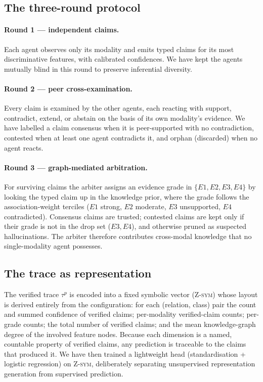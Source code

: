 \documentclass[runningheads]{llncs}
\begin{document}
\subsection{The three-round protocol}
\paragraph{Round 1 --- independent claims.}
Each agent observes only its modality and emits typed claims for its most discriminative features, with calibrated confidences. We have kept the agents mutually blind in this round to preserve inferential diversity.

\paragraph{Round 2 --- peer cross-examination.}
Every claim is examined by the other agents, each reacting with support, contradict, extend, or abstain on the basis of its own modality's evidence. We have labelled a claim consensus when it is peer-supported with no contradiction, contested when at least one agent contradicts it, and orphan (discarded) when no agent reacts.

\paragraph{Round 3 --- graph-mediated arbitration.}
For surviving claims the arbiter assigns an evidence grade in $\{E1,E2,E3,E4\}$ by looking the typed claim up in the knowledge prior, where the grade follows the association-weight terciles ($E1$ strong, $E2$ moderate, $E3$ unsupported, $E4$ contradicted). Consensus claims are trusted; contested claims are kept only if their grade is not in the drop set ($E3,E4$), and otherwise pruned as suspected hallucinations. The arbiter therefore contributes cross-modal knowledge that no single-modality agent possesses.

\subsection{The trace as representation}
The verified trace $\tau^p$ is encoded into a fixed symbolic vector (\textsc{Z-sym}) whose layout is derived entirely from the configuration: for each (relation, class) pair the count and summed confidence of verified claims; per-modality verified-claim counts; per-grade counts; the total number of verified claims; and the mean knowledge-graph degree of the involved feature nodes. Because each dimension is a named, countable property of verified claims, any prediction is traceable to the claims that produced it. We have then trained a lightweight head (standardisation + logistic regression) on \textsc{Z-sym}, deliberately separating unsupervised representation generation from supervised prediction.
\end{document}

